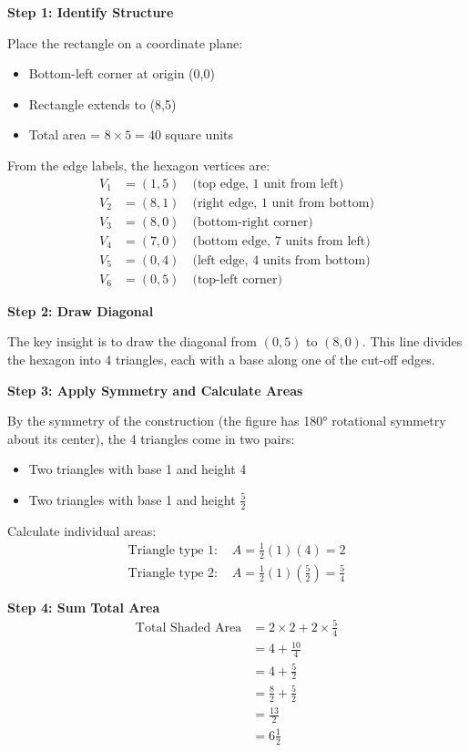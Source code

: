 \documentclass[11pt]{article}
\begin{document}
\textbf{Step 1: Identify Structure}

Place the rectangle on a coordinate plane:
\begin{itemize}
    \item Bottom-left corner at origin (0,0)
    \item Rectangle extends to (8,5)
    \item Total area = $8 \times 5 = 40$ square units
\end{itemize}

From the edge labels, the hexagon vertices are:
\begin{align*}
V_1 &= (1, 5) \quad \text{(top edge, 1 unit from left)}\\
V_2 &= (8, 1) \quad \text{(right edge, 1 unit from bottom)}\\
V_3 &= (8, 0) \quad \text{(bottom-right corner)}\\
V_4 &= (7, 0) \quad \text{(bottom edge, 7 units from left)}\\
V_5 &= (0, 4) \quad \text{(left edge, 4 units from bottom)}\\
V_6 &= (0, 5) \quad \text{(top-left corner)}
\end{align*}

\textbf{Step 2: Draw Diagonal}

The key insight is to draw the diagonal from $(0,5)$ to $(8,0)$. This line divides the hexagon into 4 triangles, each with a base along one of the cut-off edges.

\textbf{Step 3: Apply Symmetry and Calculate Areas}

By the symmetry of the construction (the figure has 180° rotational symmetry about its center), the 4 triangles come in two pairs:
\begin{itemize}
    \item Two triangles with base 1 and height 4
    \item Two triangles with base 1 and height $\frac{5}{2}$
\end{itemize}

Calculate individual areas:
\begin{align*}
\text{Triangle type 1: } & A = \frac{1}{2}(1)(4) = 2\\
\text{Triangle type 2: } & A = \frac{1}{2}(1)\left(\frac{5}{2}\right) = \frac{5}{4}
\end{align*}

\textbf{Step 4: Sum Total Area}
\begin{align*}
\text{Total Shaded Area} &= 2 \times 2 + 2 \times \frac{5}{4}\\
&= 4 + \frac{10}{4}\\
&= 4 + \frac{5}{2}\\
&= \frac{8}{2} + \frac{5}{2}\\
&= \frac{13}{2}\\
&= 6\frac{1}{2}
\end{align*}
\end{document}
